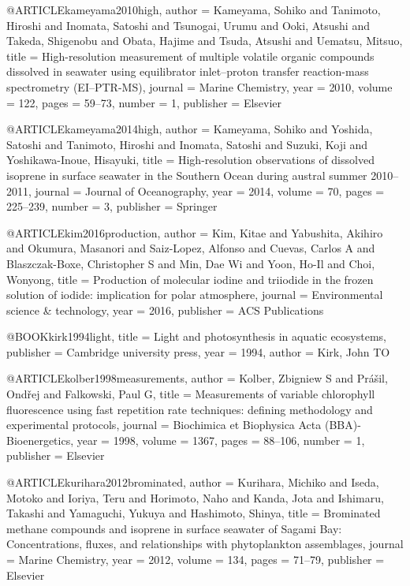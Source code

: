@ARTICLE{kameyama2010high,
  author = {Kameyama, Sohiko and Tanimoto, Hiroshi and Inomata, Satoshi and Tsunogai,
	Urumu and Ooki, Atsushi and Takeda, Shigenobu and Obata, Hajime and
	Tsuda, Atsushi and Uematsu, Mitsuo},
  title = {High-resolution measurement of multiple volatile organic compounds
	dissolved in seawater using equilibrator inlet--proton transfer reaction-mass
	spectrometry (EI--PTR-MS)},
  journal = {Marine Chemistry},
  year = {2010},
  volume = {122},
  pages = {59--73},
  number = {1},
  publisher = {Elsevier}
}

@ARTICLE{kameyama2014high,
  author = {Kameyama, Sohiko and Yoshida, Satoshi and Tanimoto, Hiroshi and Inomata,
	Satoshi and Suzuki, Koji and Yoshikawa-Inoue, Hisayuki},
  title = {High-resolution observations of dissolved isoprene in surface seawater
	in the Southern Ocean during austral summer 2010--2011},
  journal = {Journal of Oceanography},
  year = {2014},
  volume = {70},
  pages = {225--239},
  number = {3},
  publisher = {Springer}
}

@ARTICLE{kim2016production,
  author = {Kim, Kitae and Yabushita, Akihiro and Okumura, Masanori and Saiz-Lopez,
	Alfonso and Cuevas, Carlos A and Blaszczak-Boxe, Christopher S and
	Min, Dae Wi and Yoon, Ho-Il and Choi, Wonyong},
  title = {Production of molecular iodine and triiodide in the frozen solution
	of iodide: implication for polar atmosphere},
  journal = {Environmental science \& technology},
  year = {2016},
  publisher = {ACS Publications}
}

@BOOK{kirk1994light,
  title = {Light and photosynthesis in aquatic ecosystems},
  publisher = {Cambridge university press},
  year = {1994},
  author = {Kirk, John TO}
}

@ARTICLE{kolber1998measurements,
  author = {Kolber, Zbigniew S and Pr{\'a}{\v{s}}il, Ond{\v{r}}ej and Falkowski,
	Paul G},
  title = {Measurements of variable chlorophyll fluorescence using fast repetition
	rate techniques: defining methodology and experimental protocols},
  journal = {Biochimica et Biophysica Acta (BBA)-Bioenergetics},
  year = {1998},
  volume = {1367},
  pages = {88--106},
  number = {1},
  publisher = {Elsevier}
}

@ARTICLE{kurihara2012brominated,
  author = {Kurihara, Michiko and Iseda, Motoko and Ioriya, Teru and Horimoto,
	Naho and Kanda, Jota and Ishimaru, Takashi and Yamaguchi, Yukuya
	and Hashimoto, Shinya},
  title = {Brominated methane compounds and isoprene in surface seawater of
	Sagami Bay: Concentrations, fluxes, and relationships with phytoplankton
	assemblages},
  journal = {Marine Chemistry},
  year = {2012},
  volume = {134},
  pages = {71--79},
  publisher = {Elsevier}
}

